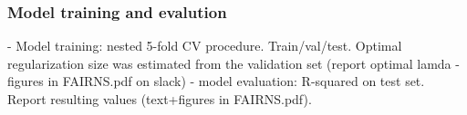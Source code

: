 \subsubsection{Model training and evalution}
- Model training: nested 5-fold CV procedure. Train/val/test. Optimal regularization size was estimated from the validation set (report optimal lamda - figures in FAIRNS.pdf on slack)
- model evaluation: R-squared on test set. Report resulting values (text+figures in FAIRNS.pdf). 


